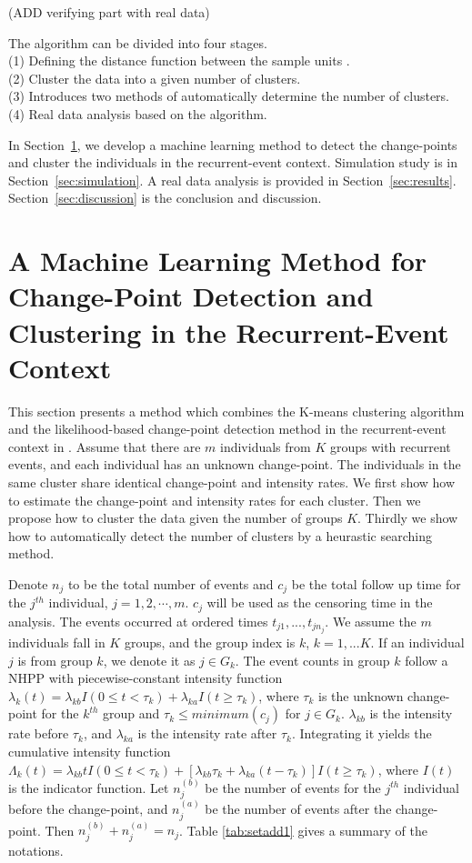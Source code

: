 \documentclass[12pt]{article}
\begin{document}
(ADD verifying part with real data)

The algorithm can be divided into four stages. \\
(1) Defining the distance function between the sample units .\\
(2) Cluster the data into a given number of clusters.\\
(3) Introduces two methods of automatically determine the number of clusters. \\
(4) Real data analysis based on the algorithm.


In Section~\ref{sec:models.kmean}, we develop a machine learning method to detect the change-points and cluster the individuals in the recurrent-event context. Simulation study is in Section~\ref{sec:simulation}. A real data analysis is provided in Section~\ref{sec:results}. Section~\ref{sec:discussion} is the conclusion and discussion. %

\section{A Machine Learning Method for Change-Point Detection and Clustering in the Recurrent-Event Context}\label{sec:models.kmean}
This section presents a method which combines the K-means clustering algorithm and the likelihood-based change-point detection method in the recurrent-event context in \citet{Frobish2009}. Assume that there are $m$ individuals from $K$ groups with recurrent events, and each individual has an unknown change-point. The individuals in the same cluster share identical change-point and intensity rates. We first show how to estimate the change-point and intensity rates for each cluster.  Then we propose how to cluster the data given the number of groups $K$. Thirdly we show how to automatically detect the number of clusters by a heurastic searching method.


Denote $n_j$ to be the total number of events and $c_j$ be the total follow up time for the $j^{th}$ individual, $j=1,2,\cdots,m$. $c_j$ will be used as the censoring time in the analysis. The events occurred at ordered times $t_{j1},...,t_{jn_j}$.  We assume the $m$ individuals fall in $K$ groups, and the group index is $k$, $k=1,...K$. If an individual $j$ is from group $k$, we denote it as $j \in G_k$. The event counts in group $k$ follow a NHPP with piecewise-constant intensity function $\lambda_k(t)=\lambda_{kb}I(0 \leq t < \tau_k)+\lambda_{ka}I( t\geq \tau_k)$, where $\tau_k$ is the unknown change-point for the $k^{th}$ group and $\tau_k \leq minimum(c_j)$ for $j\in G_k$. $\lambda_{kb}$ is the intensity rate before $\tau_k$, and $\lambda_{ka} $ is the intensity rate after $\tau_k$. Integrating it yields the cumulative intensity function $\Lambda_k(t)=\lambda_{kb}tI(0\leq t<\tau_k)+\left[ \lambda_{kb}\tau_k+\lambda_{ka}(t-\tau_k)\right] I(t\geq \tau_k)$, where $I(t)$ is the indicator function. Let $n_j^{(b)} $ be the number of events for the $j^{th}$ individual before the change-point, and $n_j^{(a)} $ be the number of events after the change-point. Then $n_j^{(b)}+n_j^{(a)}=n_j$. Table \ref{tab:setadd1} gives a summary of the notations. 
\end{document}
